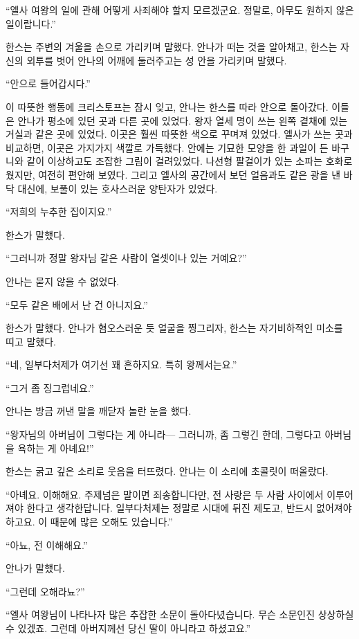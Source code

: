 ``엘사 여왕의 일에 관해 어떻게 사죄해야 할지 모르겠군요. 정말로, 아무도 원하지 않은 일이랍니다.''

한스는 주변의 겨울을 손으로 가리키며 말했다. 안나가 떠는 것을 알아채고, 한스는 자신의 외투를 벗어 안나의 어깨에 둘러주고는 성 안을 가리키며 말했다.

``안으로 들어갑시다.''

이 따뜻한 행동에 크리스토프는 잠시 잊고, 안나는 한스를 따라 안으로 돌아갔다. 이들은 안나가 평소에 있던 곳과 다른 곳에 있었다. 왕자 열세 명이 쓰는 왼쪽 곁채에 있는 거실과 같은 곳에 있었다. 이곳은 훨씬 따뜻한 색으로 꾸며져 있었다. 엘사가 쓰는 곳과 비교하면, 이곳은 가지가지 색깔로 가득했다. 안에는 기묘한 모양을 한 과일이 든 바구니와 같이 이상하고도 조잡한 그림이 걸려있었다. 나선형 팔걸이가 있는 소파는 호화로웠지만, 여전히 편안해 보였다. 그리고 엘사의 공간에서 보던 얼음과도 같은 광을 낸 바닥 대신에, 보풀이 있는 호사스러운 양탄자가 있었다.

``저희의 누추한 집이지요.''

한스가 말했다.

``그러니까 정말 왕자님 같은 사람이 열셋이나 있는 거예요?''

안나는 묻지 않을 수 없었다.

``모두 같은 배에서 난 건 아니지요.''

한스가 말했다. 안나가 혐오스러운 듯 얼굴을 찡그리자, 한스는 자기비하적인 미소를 띠고 말했다.

``네, 일부다처제가 여기선 꽤 흔하지요. 특히 왕께서는요.''

``그거 좀 징그럽네요.''

안나는 방금 꺼낸 말을 깨닫자 놀란 눈을 했다.

``왕자님의 아버님이 그렇다는 게 아니라— 그러니까, 좀 그렇긴 한데, 그렇다고 아버님을 욕하는 게 아녜요!''

한스는 굵고 깊은 소리로 웃음을 터뜨렸다. 안나는 이 소리에 초콜릿이 떠올랐다.

``아녜요. 이해해요. 주제넘은 말이면 죄송합니다만, 전 사랑은 두 사람 사이에서 이루어져야 한다고 생각한답니다. 일부다처제는 정말로 시대에 뒤진 제도고, 반드시 없어져야 하고요. 이 때문에 많은 오해도 있습니다.''

``아뇨, 전 이해해요.''

안나가 말했다.

``그런데 오해라뇨?''

``엘사 여왕님이 나타나자 많은 추잡한 소문이 돌아다녔습니다. 무슨 소문인진 상상하실 수 있겠죠. 그런데 아버지께선 당신 딸이 아니라고 하셨고요.''

